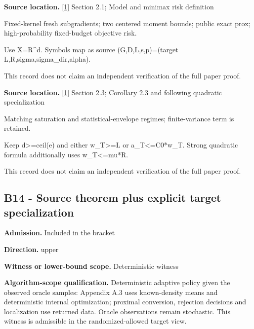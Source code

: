\documentclass[10pt,a4paper]{article}
\begin{document}
\textbf{Source location.} \href{https://arxiv.org/html/2610.00260v2}{[1]} Section 2.1; Model and minimax risk definition



Fixed-kernel fresh subgradients; two centered moment bounds; public exact prox; high-probability fixed-budget objective risk.



Use X=R\textasciicircum{}d. Symbols map as source (G,D,L,s,p)=(target L,R,sigma,sigma\_dir,alpha).



This record does not claim an independent verification of the full paper proof.



\textbf{Source location.} \href{https://arxiv.org/html/2610.00260v2}{[1]} Section 2.3; Corollary 2.3 and following quadratic specialization



Matching saturation and statistical-envelope regimes; finite-variance term is retained.



Keep d>=ceil(e) and either w\_T>=L or a\_T<=C0*w\_T. Strong quadratic formula additionally uses w\_T<=mu*R.



This record does not claim an independent verification of the full paper proof.



\subsection{B14 - Source theorem plus explicit target specialization}


\textbf{Admission.} Included in the bracket



\textbf{Direction.} upper



\textbf{Witness or lower-bound scope.} Deterministic witness



\textbf{Algorithm-scope qualification.} Deterministic adaptive policy given the observed oracle samples: Appendix A.3 uses known-density means and deterministic internal optimization; proximal conversion, rejection decisions and localization use returned data. Oracle observations remain stochastic. This witness is admissible in the randomized-allowed target view.
\end{document}
